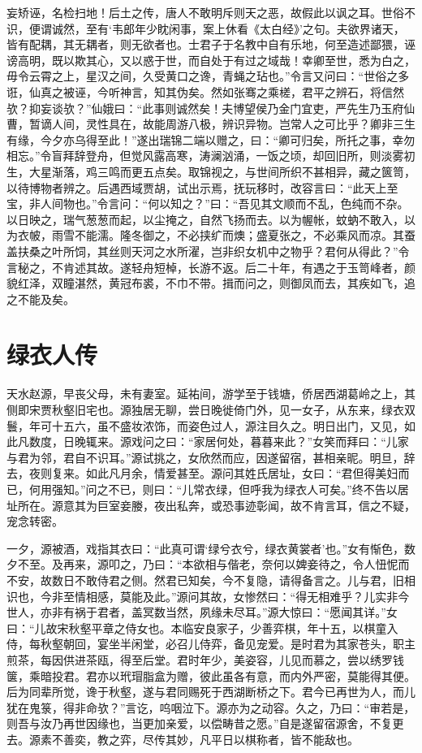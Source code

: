 \documentclass[a4paper,12pt,UTF8,twoside]{ctexbook}
\begin{document}
妄矫诬，名检扫地！后土之传，唐人不敢明斥则天之恶，故假此以讽之耳。世俗不识，便谓诚然，至有‘韦郎年少眈闲事，案上休看《太白经》’之句。夫欲界诸天，皆有配耦，其无耦者，则无欲者也。士君子于名教中自有乐地，何至造述鄙猥，诬谤高明，既以欺其心，又以惑于世，而自处于有过之域哉！幸卿至世，悉为白之，毋令云霄之上，星汉之间，久受黄口之谗，青蝇之玷也。”令言又问曰：“世俗之多诳，仙真之被诬，今听神言，知其伪矣。然如张骞之乘槎，君平之辨石，将信然欤？抑妄谈欤？”仙娥曰：“此事则诚然矣！夫博望侯乃金门宜吏，严先生乃玉府仙曹，暂谪人间，灵性具在，故能周游八极，辨识异物。岂常人之可比乎？卿非三生有缘，今夕亦乌得至此！”遂出瑞锦二端以赠之，曰：“卿可归矣，所托之事，幸勿相忘。”令盲拜辞登舟，但觉风露高寒，涛澜汹涌，一饭之顷，却回旧所，则淡雾初生，大星渐落，鸡三鸣而更五点矣。取锦视之，与世间所织不甚相异，藏之篋笥，以待博物者辨之。后遇西域贾胡，试出示焉，抚玩移时，改容言曰：“此天上至宝，非人间物也。”令言问：“何以知之？”曰：“吾见其文顺而不乱，色纯而不杂。以日映之，瑞气葱葱而起，以尘掩之，自然飞扬而去。以为幄帐，蚊蚋不敢入，以为衣帔，雨雪不能濡。隆冬御之，不必挟纩而燠；盛夏张之，不必乘风而凉。其蚕盖扶桑之叶所饲，其丝则天河之水所濯，岂非织女机中之物乎？君何从得此？”令言秘之，不肯述其故。遂轻舟短棹，长游不返。后二十年，有遇之于玉笥峰者，颜貌红泽，双瞳湛然，黄冠布裘，不巾不带。揖而问之，则御凤而去，其疾如飞，追之不能及矣。

\chapter{绿衣人传}

天水赵源，早丧父母，未有妻室。延祐间，游学至于钱塘，侨居西湖葛岭之上，其侧即宋贾秋壑旧宅也。源独居无聊，尝日晚徙倚门外，见一女子，从东来，绿衣双鬟，年可十五六，虽不盛妆浓饰，而姿色过人，源注目久之。明日出门，又见，如此凡数度，日晚辄来。源戏问之曰：“家居何处，暮暮来此？”女笑而拜曰：“儿家与君为邻，君自不识耳。”源试挑之，女欣然而应，因遂留宿，甚相亲昵。明旦，辞去，夜则复来。如此凡月余，情爱甚至。源问其姓氏居址，女曰：“君但得美妇而已，何用强知。”问之不已，则曰：“儿常衣绿，但呼我为绿衣人可矣。”终不告以居址所在。源意其为巨室妾媵，夜出私奔，或恐事迹彰闻，故不肯言耳，信之不疑，宠念转密。

一夕，源被酒，戏指其衣曰：“此真可谓‘绿兮衣兮，绿衣黄裳者’也。”女有惭色，数夕不至。及再来，源叩之，乃曰：“本欲相与偕老，奈何以婢妾待之，令人忸怩而不安，故数日不敢侍君之侧。然君已知矣，今不复隐，请得备言之。儿与君，旧相识也，今非至情相感，莫能及此。”源问其故，女惨然曰：“得无相难乎？儿实非今世人，亦非有祸于君者，盖冥数当然，夙缘未尽耳。”源大惊曰：“愿闻其详。”女曰：“儿故宋秋壑平章之侍女也。本临安良家子，少善弈棋，年十五，以棋童入侍，每秋壑朝回，宴坐半闲堂，必召儿侍弈，备见宠爱。是时君为其家苍头，职主煎茶，每因供进茶瓯，得至后堂。君时年少，美姿容，儿见而慕之，尝以绣罗钱箧，乘暗投君。君亦以玳瑁脂盒为赠，彼此虽各有意，而内外严密，莫能得其便。后为同辈所觉，谗于秋壑，遂与君同赐死于西湖断桥之下。君今已再世为人，而儿犹在鬼箓，得非命欤？”言讫，呜咽泣下。源亦为之动容。久之，乃曰：“审若是，则吾与汝乃再世因缘也，当更加亲爱，以偿畴昔之愿。”自是遂留宿源舍，不复更去。源素不善奕，教之弈，尽传其妙，凡平日以棋称者，皆不能敌也。
\end{document}
